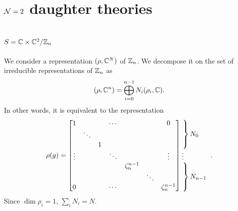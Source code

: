\section{$\mathcal{N}=2$ daughter theories}\label{sec:N2QGT}


    \subsection{$S=\mathbb{C}\times\mathbb{C}^2/\mathbb{Z}_n$}

        We consider a representation $(\rho,\mathbb{C}^N)$ of $\mathbb{Z}_n$. We decompose it on the set of irreducible representations of $\mathbb{Z}_n$ as
        \begin{equation}
            (\rho,\mathbb{C}^n)=\bigoplus^{n-1}_{i=0}N_i(\rho_i,\mathbb{C}).
        \end{equation}
        In other words, it is equivalent to the representation
        \begin{equation}
            \rho(g)=
            \begin{bmatrix}
                1 & & & \cdots & & & 0 \\
                & \ddots & & & & & \\
                & & 1 & & & &  \\
                \vdots & & & \ddots & & & \vdots \\
                & & & & \zeta^{n-1}_n & & \\
                & & & & & \ddots & \\
                0 & & & \cdots & & & \zeta^{n-1}_n 
            \end{bmatrix}
            \hspace{-0.2cm}
            \begin{tabular}{l}
            $\left.\lefteqn{\phantom{
                \begin{matrix}
                    a_0\\ \ddots\\ a_0\ 
                \end{matrix} 
            }}\right\}N_0$\\
            \vdots \\
            $\left.\lefteqn{\phantom{
                \begin{matrix}
                    b_0\\ \ddots\\ b_0\ 
                \end{matrix}
            }} \right\}N_{n-1}$
            \end{tabular}.\label{eq:reprrhoZn}
        \end{equation}
        Since $\dim\rho_i=1$, $\sum_i N_i=N$. 

